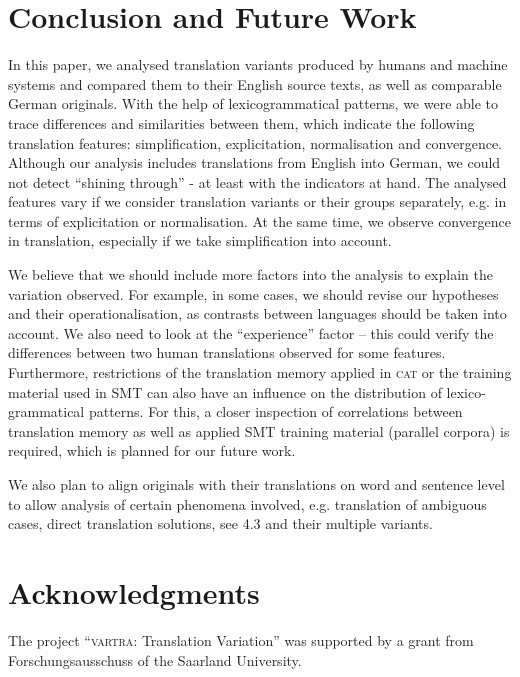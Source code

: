 \documentclass[output=paper]{LSP/langsci}
\begin{document}
\section{Conclusion and Future Work} \label{sec:4:5}

In this paper, we analysed translation variants produced by humans and machine systems and compared them to their English source texts, as well as comparable German originals. With the help of lexicogrammatical patterns, we were able to trace differences and similarities between them, which indicate the following translation features: simplification, explicitation, normalisation and convergence. Although our analysis includes translations from English into German, we could not detect “shining through” - at least with the indicators at hand. The analysed features vary if we consider translation variants or their groups separately, e.g. in terms of explicitation or normalisation. At the same time, we observe convergence in translation, especially if we take simplification into account.

We believe that we should include more factors into the analysis to explain the variation observed. For example, in some cases, we should revise our hypotheses and their operationalisation, as contrasts between languages should be taken into account. We also need to look at the “experience” factor – this could verify the differences between two human translations observed for some features. Furthermore, restrictions of the translation memory applied in \textsc{cat} or the training material used in SMT can also have an influence on the distribution of lexico-grammatical patterns. For this, a closer inspection of correlations between translation memory as well as applied SMT training material (parallel corpora) is required, which is planned for our future work.

We also plan to align originals with their translations on word and sentence level to allow analysis of certain phenomena involved, e.g. translation of ambiguous cases, direct translation solutions, see 4.3 and their multiple variants.

\section*{Acknowledgments}
The project “\textsc{vartra}: Translation Variation” was supported by a grant from Forschungsausschuss of the Saarland University.


\printbibliography[heading=subbibliography,notkeyword=this]
\end{document}
